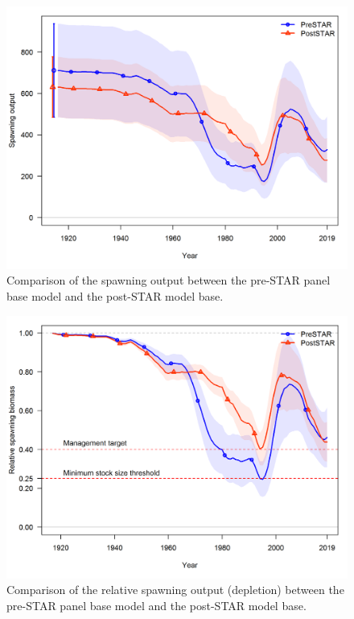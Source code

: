\documentclass[12pt,]{article}
\begin{document}
\begin{figure}
\centering
\includegraphics{Figures/preSTAR_postSTAR_compare_spawnbio}
\caption{Comparison of the spawning output between the pre-STAR panel
base model and the post-STAR model base.
\label{fig:preSTAR_postSTAR_compare_spawnbio}}
\end{figure}

\FloatBarrier

\begin{figure}
\centering
\includegraphics{Figures/preSTAR_postSTAR_compare_Bratio}
\caption{Comparison of the relative spawning output (depletion) between
the pre-STAR panel base model and the post-STAR model base.
\label{fig:preSTAR_postSTAR_compare_Bratio}}
\end{figure}
\end{document}

